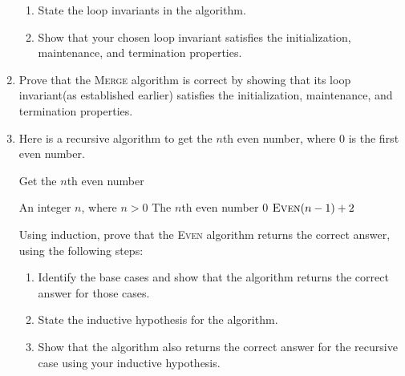 \begin{exercises}
\begin{enumerate}
        \begin{enumerate}
            \item State the loop invariants in the algorithm.
            \item Show that your chosen loop invariant satisfies the initialization, maintenance, and termination properties.
        \end{enumerate}

    \item[\challenge] Prove that the \textsc{Merge} algorithm is correct by showing that its loop invariant(as established earlier) satisfies the initialization, maintenance, and termination properties.

    \item Here is a recursive algorithm to get the $n$th even number, where $0$ is the first even number.
    \begin{algorithm}[H]
        \caption{Get the $n$th even number}
        \begin{algorithmic}[1]
            \Require An integer $n$, where $n>0$
            \Ensure The $n$th even number
                    \Return $0$
                \Else
                    \Return $\text{\Call{Even}{$n-1$}} + 2$
                \EndIf
            \EndFunction
        \end{algorithmic}
    \end{algorithm}
        Using induction, prove that the \textsc{Even} algorithm returns the correct answer, using the following steps:
        \begin{enumerate}
            \item Identify the base cases and show that the algorithm returns the correct answer for those cases.
            \item State the inductive hypothesis for the algorithm.
            \item Show that the algorithm also returns the correct answer for the recursive case using your inductive hypothesis.
        \end{enumerate}


\end{enumerate}
\end{exercises}
